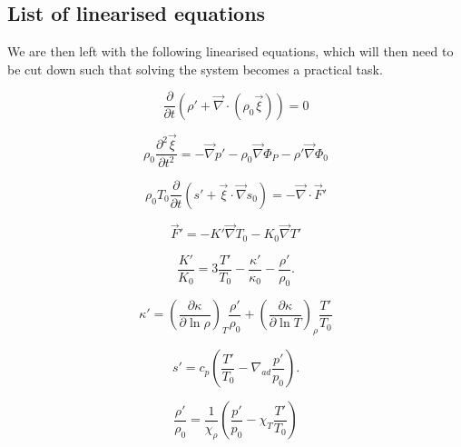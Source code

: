 \documentclass[11pt]{amsart}
\begin{document}
\subsection{List of linearised equations}

We are then left with the following linearised equations, which will then need to be cut down such that solving
the system becomes a practical task.


\begin{equation} \label{eq:cont_lin}
\frac{\partial}{\partial t} \left( \rho' + \vec{\nabla} \cdot \left( \rho_{0} \vec{\xi} \right) \right) = 0
\end{equation}


\begin{equation} \label{eq:mom_lin}
\rho_{0} \frac{\partial^{2} \vec{\xi}}{\partial t^{2}} = - \vec{\nabla} p' - \rho_{0} \vec{\nabla} \Phi_{P}
- \rho' \vec{\nabla} \Phi_{0}
\end{equation}

\begin{equation} \label{eq:E_lin}
\rho_{0} T_{0} \frac{\partial}{\partial t} \left( s' + \vec{\xi} \cdot \vec{\nabla} s_{0} \right)
= - \vec{\nabla} \cdot \vec{F}'
\end{equation}


\begin{equation} \label{eq:F_lin}
\vec{F}' = - K' \vec{\nabla} T_{0} - K_{0} \vec{\nabla} T'
\end{equation}



\begin{equation} \label{eq:K_lin}
\frac{K'}{K_{0}} = 3 \frac{T'}{T_{0}} - \frac{\kappa'}{\kappa_{0}} - \frac{\rho'}{\rho_{0}}.
\end{equation}



\begin{equation} \label{eq:kap_lin}
\kappa' = \left( \frac{\partial \kappa}{\partial \ln \rho} \right)_{T} \frac{\rho'}{\rho_{0}} + \left( \frac{\partial \kappa}{\partial \ln T} \right)_{\rho} \frac{T'}{T_{0}}
\end{equation}


\begin{equation} \label{eq:ent_lin}
s' = c_{p} \left( \frac{T'}{T_{0}} - \nabla_{ad} \frac{p'}{p_{0}} \right).
\end{equation} 



\begin{equation} \label{eq:rho_lin}
\frac{\rho'}{\rho_{0}}= \frac{1}{\chi_{\rho}} \left( \frac{p'}{p_{0}} - \chi_{T} \frac{T'}{T_{0}} \right)
\end{equation}
\end{document}
